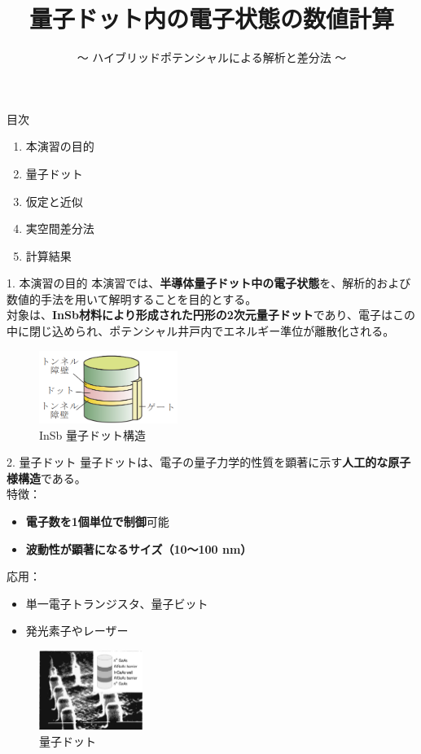 \documentclass[dvipdfmx]{beamer}
\title{量子ドット内の電子状態の数値計算}
\subtitle{～ ハイブリッドポテンシャルによる解析と差分法 ～}
\author{}
\date{}
\begin{document}
\frame{\titlepage}

\begin{frame}{目次}
\begin{enumerate}
  \item 本演習の目的
  \item 量子ドット
  \item 仮定と近似
  \item 実空間差分法
  \item 計算結果
\end{enumerate}
\end{frame}

\begin{frame}{1. 本演習の目的}
本演習では、\textbf{半導体量子ドット中の電子状態}を、解析的および数値的手法を用いて解明することを目的とする。\\

対象は、\textbf{InSb材料により形成された円形の2次元量子ドット}であり、電子はこの中に閉じ込められ、ポテンシャル井戸内でエネルギー準位が離散化される。

\begin{figure}[H]
\centering
\includegraphics[width=0.4\textwidth]{images/ドット.png}
\caption{InSb 量子ドット構造}
\end{figure}
\end{frame}

\begin{frame}{2. 量子ドット}
量子ドットは、電子の量子力学的性質を顕著に示す\textbf{人工的な原子様構造}である。\\

特徴：
\begin{itemize}
  \item \textbf{電子数を1個単位で制御}可能
  \item \textbf{波動性が顕著になるサイズ（10〜100 nm）}
\end{itemize}

応用：
\begin{itemize}
  \item 単一電子トランジスタ、量子ビット
  \item 発光素子やレーザー
\end{itemize}

\begin{figure}[H]
\centering
\includegraphics[width=0.3\textwidth]{images/量子ドット.png}
\caption{量子ドット}
\end{figure}
\end{frame}
\end{document}
